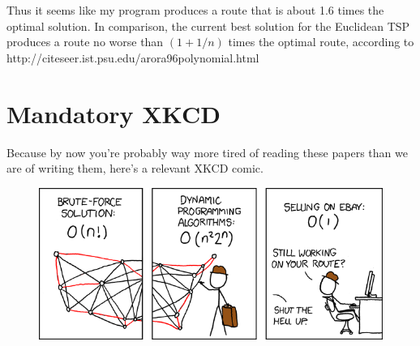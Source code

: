 \documentclass[paper=a4, fontsize=11pt]{scrartcl} %
\numberwithin{equation}{section} %
\numberwithin{figure}{section} %
\numberwithin{table}{section} %
\begin{document}
Thus it seems like my program produces a route that is about 1.6 times the optimal solution. In comparison, the current best solution for the Euclidean TSP produces a route no worse than $(1 + 1/n)$ times the optimal route, according to \\
http://citeseer.ist.psu.edu/arora96polynomial.html

\section{Mandatory XKCD}
Because by now you're probably way more tired of reading these papers than we are of writing them, here's a relevant XKCD comic.
\begin{figure}[ht!]
\centering
\includegraphics[width=122mm]{xkcd}
\label{overflow}
\end{figure}
\end{document}
